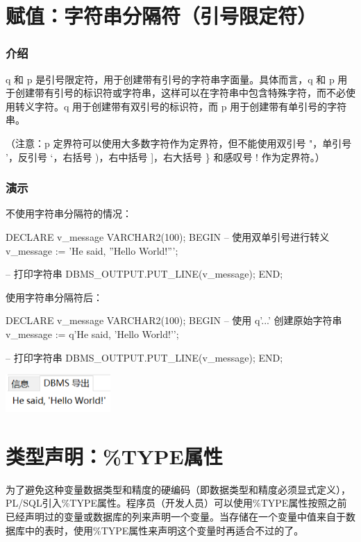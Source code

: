 \documentclass[11pt, a4paper, oneside, UTF8]{ctexbook}
\begin{document}
\section{赋值：字符串分隔符（引号限定符）}
\subsubsection{介绍}
q 和 p 是引号限定符，用于创建带有引号的字符串字面量。具体而言，q 和 p 用于创建带有引号的标识符或字符串，这样可以在字符串中包含特殊字符，而不必使用转义字符。q 用于创建带有双引号的标识符，而 p 用于创建带有单引号的字符串。

（注意：p 定界符可以使用大多数字符作为定界符，但不能使用双引号 "，单引号 '，反引号 `，右括号 )，右中括号 ]，右大括号 \} 和感叹号 ! 作为定界符。）
\subsubsection{演示}
不使用字符串分隔符的情况：
\begin{plsql}[caption=不使用字符串分隔符]
DECLARE
  v_message VARCHAR2(100);
BEGIN
  -- 使用双单引号进行转义
  v_message := 'He said, ''Hello World!''';

  -- 打印字符串
  DBMS_OUTPUT.PUT_LINE(v_message);
END;
\end{plsql}
使用字符串分隔符后：
\begin{plsql}[caption=使用字符串分隔符]
DECLARE
  v_message VARCHAR2(100);
BEGIN
  -- 使用 q'...' 创建原始字符串
  v_message := q'{He said, 'Hello World!'}';

  -- 打印字符串
  DBMS_OUTPUT.PUT_LINE(v_message);
END;
\end{plsql}
\begin{center}
  \begin{minipage}{\textwidth}
    \center
    \includegraphics[width=0.3\textwidth]{picture/字符串分隔符效果图.png}
    \captionsetup{hypcap=false}
    \label{fig:字符串分隔符效果图}
  \end{minipage}
\end{center}
\section{类型声明：\%TYPE属性}
为了避免这种变量数据类型和精度的硬编码（即数据类型和精度必须显式定义），PL/SQL引入\%TYPE属性。程序员（开发人员）可以使用\%TYPE属性按照之前已经声明过的变量或数据库的列来声明一个变量。当存储在一个变量中值来自于数据库中的表时，使用\%TYPE属性来声明这个变量时再适合不过的了。
\end{document}
